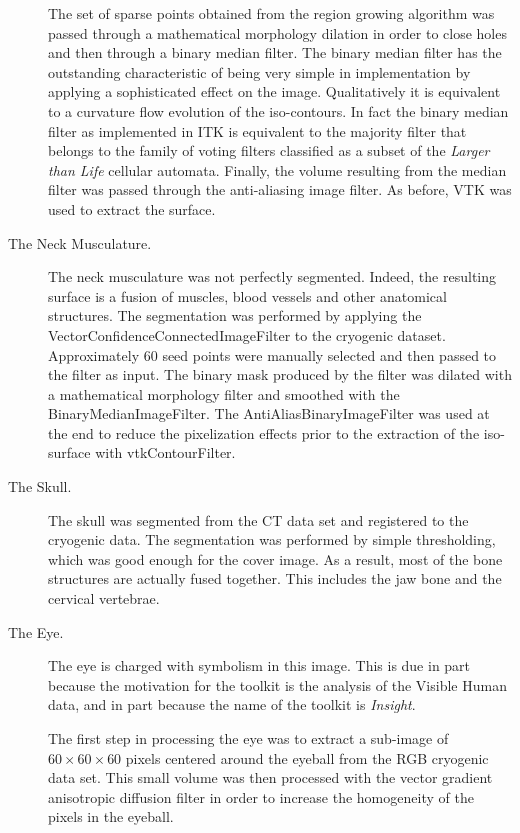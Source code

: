 \begin{description}
The set of sparse points obtained from the region growing algorithm was
passed through a mathematical morphology dilation in order to close holes and
then through a binary median filter. The binary median filter has the
outstanding characteristic of being very simple in implementation by applying
a sophisticated effect on the image. Qualitatively it is equivalent to a
curvature flow evolution of the iso-contours. In fact the binary median
filter as implemented in ITK is equivalent to the majority filter that
belongs to the family of voting filters classified as a subset of the
\emph{Larger than Life} cellular automata. Finally, the volume resulting from
the median filter was passed through the anti-aliasing image filter. As
before, VTK was used to extract the surface.

\item[The Neck Musculature.]
The neck musculature was not perfectly segmented. Indeed, the resulting
surface is a fusion of muscles, blood vessels and other anatomical
structures. The segmentation was performed by applying the
VectorConfidenceConnectedImageFilter to the cryogenic dataset. Approximately
60 seed points were manually selected and then passed to the filter as
input. The binary mask produced by the filter was dilated with a mathematical
morphology filter and smoothed with the BinaryMedianImageFilter. The
AntiAliasBinaryImageFilter was used at the end to reduce the pixelization
effects prior to the extraction of the iso-surface with vtkContourFilter.

\item[The Skull.]
The skull was segmented from the CT data set and registered to the cryogenic
data. The segmentation was performed by simple thresholding, which was good
enough for the cover image. As a result, most of the bone structures are
actually fused together. This includes the jaw bone and the cervical
vertebrae.

\item[The Eye.]
The eye is charged with symbolism in this image. This is due in part because
the motivation for the toolkit is the analysis of the Visible Human data,
and in part because the name of the toolkit is \emph{Insight}.

The first step in processing the eye was to extract a sub-image of
$60\times60\times60$ pixels centered around the eyeball from the RGB
cryogenic data set. This small volume was then processed with the vector
gradient anisotropic diffusion filter in order to increase the homogeneity of
the pixels in the eyeball.


\end{description}
